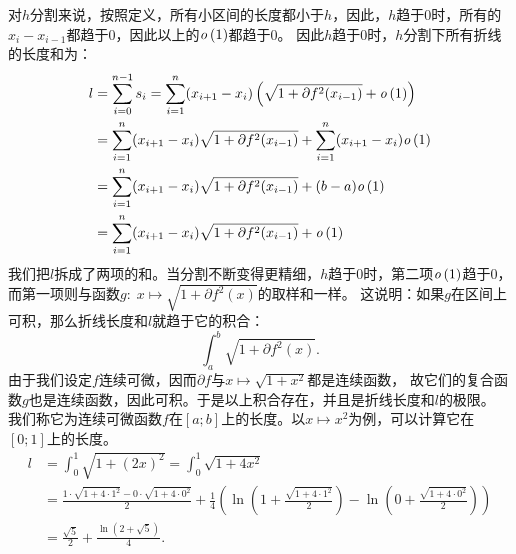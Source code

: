 \documentclass[12pt,UTF8,fontset=none]{ctexbook}
\begin{document}
\begin{so}
    对$h$\dash 分割来说，按照定义，所有小区间的长度都小于$h$，因此，$h$趋于$0$时，所有的$x_i - x_{i-1}$都趋于$0$，因此以上的$\mathit{o}\left(1\right)$都趋于$0$。
    因此$h$趋于$0$时，$h$\dash 分割下所有折线的长度和为：
    \begin{align*}
        l &= \sum_{i=0}^{n-1} s_i = \sum_{i=1}^{n} (x_{i+1} - x_{i})\left(\sqrt{1 + \partial f^2(x_{i-1})} + \mathit{o}\left(1\right)\right) \\
        &= \sum_{i=1}^{n} (x_{i+1} - x_{i})\sqrt{1 + \partial f^2(x_{i-1})} + \sum_{i=1}^{n} (x_{i+1} - x_{i})\mathit{o}\left(1\right) \\
        &= \sum_{i=1}^{n} (x_{i+1} - x_{i})\sqrt{1 + \partial f^2(x_{i-1})} + (b - a)\mathit{o}\left(1\right) \\
        &= \sum_{i=1}^{n} (x_{i+1} - x_{i})\sqrt{1 + \partial f^2(x_{i-1})} + \mathit{o}\left(1\right)
    \end{align*}
    我们把$l$拆成了两项的和。当分割不断变得更精细，$h$趋于$0$时，第二项$\mathit{o}\left(1\right)$趋于$0$，
    而第一项则与函数$g: \;x\mapsto \sqrt{1 + \partial f^2(x) }$的取样和一样。
    这说明：如果$g$在区间上可积，那么折线长度和$l$就趋于它的积合：
    $$ \int_a^b \sqrt{1 + \partial f^2(x) }. $$
    由于我们设定$f$连续可微，因而$\partial f$与$x\mapsto \sqrt{1 + x^2}$都是连续函数，
    故它们的复合函数$g$也是连续函数，因此可积。于是以上积合存在，并且是折线长度和$l$的极限。
    我们称它为连续可微函数$f$在$[a;b]$上的长度。以$x\mapsto x^2$为例，可以计算它在$[0;1]$上的长度。 
    \begin{align*}
        l &= \int_0^1 \sqrt{1 + (2x)^2 } = \int_0^1 \sqrt{1 + 4x^2 } \\
        &= \frac{1\cdot \sqrt{1 + 4\cdot 1^2} - 0\cdot \sqrt{1 + 4\cdot 0^2}}{2} + \frac{1}{4}\left( \ln{\left(1 + \frac{\sqrt{1 + 4\cdot 1^2}}{2}\right)} -  \ln{\left(0 + \frac{\sqrt{1 + 4\cdot 0^2}}{2}\right)}\right) \\
        &= \frac{\sqrt{5}}{2} + \frac{\ln{\left(2 + \sqrt{5}\right)}}{4}.
    \end{align*}

\end{so}
\end{document}
